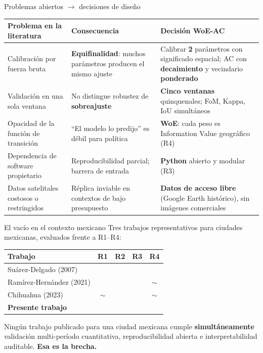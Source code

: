 \documentclass[aspectratio=169,11pt]{beamer}
\newcommand{\yes}{\textcolor{GreenOK}{\ding{51}}}
\newcommand{\no}{\textcolor{RedNo}{\ding{55}}}
\newcommand{\parcial}{\textcolor{Amber}{$\sim$}}
\newcommand{\highlight}[1]{\textcolor{UNAMBlue}{\textbf{#1}}}
\begin{document}
\begin{frame}{Problemas abiertos $\rightarrow$ decisiones de diseño}
  \scriptsize
  \begin{block}{}
  \begin{tabularx}{\linewidth}{@{}>{\raggedright\arraybackslash}p{3.0cm}XX@{}}
    \toprule
    \textbf{Problema en la literatura} & \textbf{Consecuencia} & \textbf{Decisión WoE-AC} \\
    \midrule
    Calibración por fuerza bruta & \textbf{Equifinalidad}: muchos parámetros producen el mismo ajuste & Calibrar \textbf{2} parámetros con significado espacial; AC con \textbf{decaimiento} y vecindario \textbf{ponderado} \\[3pt]
    Validación en una sola ventana & No distingue robustez de \textbf{sobreajuste} & \textbf{Cinco ventanas} quinquenales; FoM, Kappa, IoU simultáneos \\[3pt]
    Opacidad de la función de transición & ``El modelo lo predijo'' es débil para política & \textbf{WoE}: cada peso es Information Value geográfico (R4) \\[3pt]
    Dependencia de software propietario & Reproducibilidad parcial; barrera de entrada & \textbf{Python} abierto y modular (R3) \\[3pt]
    Datos satelitales costosos o restringidos & Réplica inviable en contextos de bajo presupuesto & \textbf{Datos de acceso libre} (Google Earth histórico), sin imágenes comerciales \\
    \bottomrule
  \end{tabularx}
  \end{block}
\end{frame}

\begin{frame}{El vacío en el contexto mexicano}
  \small
  Tres trabajos representativos para ciudades mexicanas, evaluados frente a R1--R4:
  \vspace{0.15cm}
  \begin{block}{}
  \centering
  \begin{tabular}{lcccc}
    \toprule
    \textbf{Trabajo} & \textbf{R1} & \textbf{R2} & \textbf{R3} & \textbf{R4} \\
    \midrule
    Suárez-Delgado (2007)      & \no       & \yes & \no  & \no \\
    Ramírez-Hernández (2021)   & \no       & \yes & \no  & \parcial \\
    Chihuahua (2023)           & \parcial  & \yes & \no  & \parcial \\
    \midrule
    \textbf{Presente trabajo}  & \yes      & \yes & \yes & \yes \\
    \bottomrule
  \end{tabular}
  \end{block}
  \vspace{0.15cm}
  \centering Ningún trabajo publicado para una ciudad mexicana cumple \highlight{simultáneamente} validación multi-período cuantitativa, reproducibilidad abierta e interpretabilidad auditable. \textbf{Esa es la brecha.}
\end{frame}
\end{document}
